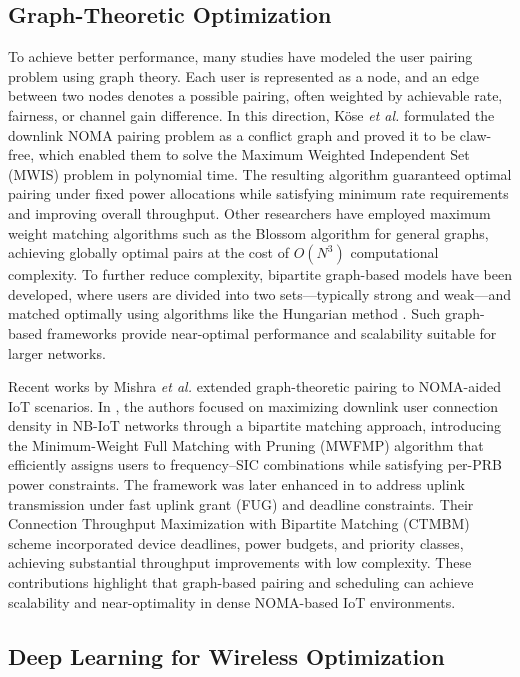 \subsection{Graph-Theoretic Optimization}

To achieve better performance, many studies have modeled the user pairing problem using graph theory. Each user is represented as a node, and an edge between two nodes denotes a possible pairing, often weighted by achievable rate, fairness, or channel gain difference. In this direction, Köse \textit{et al.} \cite{kose2021graph} formulated the downlink NOMA pairing problem as a conflict graph and proved it to be claw-free, which enabled them to solve the Maximum Weighted Independent Set (MWIS) problem in polynomial time. The resulting algorithm guaranteed optimal pairing under fixed power allocations while satisfying minimum rate requirements and improving overall throughput. Other researchers have employed maximum weight matching algorithms such as the Blossom algorithm for general graphs, achieving globally optimal pairs at the cost of $O(N^3)$ computational complexity. To further reduce complexity, bipartite graph-based models have been developed, where users are divided into two sets—typically strong and weak—and matched optimally using algorithms like the Hungarian method \cite{jia2018,sensors2023}. Such graph-based frameworks provide near-optimal performance and scalability suitable for larger networks.

Recent works by Mishra \textit{et al.} extended graph-theoretic pairing to NOMA-aided IoT scenarios. In \cite{mishra2021maximizing}, the authors focused on maximizing downlink user connection density in NB-IoT networks through a bipartite matching approach, introducing the Minimum-Weight Full Matching with Pruning (MWFMP) algorithm that efficiently assigns users to frequency–SIC combinations while satisfying per-PRB power constraints. The framework was later enhanced in \cite{mishra2022connection} to address uplink transmission under fast uplink grant (FUG) and deadline constraints. Their Connection Throughput Maximization with Bipartite Matching (CTMBM) scheme incorporated device deadlines, power budgets, and priority classes, achieving substantial throughput improvements with low complexity. These contributions highlight that graph-based pairing and scheduling can achieve scalability and near-optimality in dense NOMA-based IoT environments.

\subsection{Deep Learning for Wireless Optimization}

